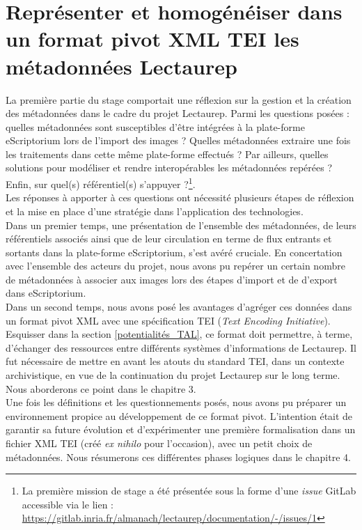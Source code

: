 \part{Représenter et homogénéiser dans un format pivot XML TEI les métadonnées Lectaurep}\label{partie_2}

La première partie du stage comportait une réflexion sur la gestion et la création des métadonnées dans le cadre du projet Lectaurep. Parmi les questions posées : quelles métadonnées sont susceptibles d'être intégrées à la plate-forme eScriptorium lors de l'import des images ? Quelles métadonnées extraire une fois les traitements dans cette même plate-forme effectués ? Par ailleurs, quelles solutions pour modéliser et rendre interopérables les  métadonnées repérées ? Enfin, sur quel(s) référentiel(s) s'appuyer ?\footnote{La première mission de stage a été présentée sous la forme d'une \textit{issue} GitLab accessible via le lien : \url{https://gitlab.inria.fr/almanach/lectaurep/documentation/-/issues/1}}.\\

Les réponses à apporter à ces questions ont nécessité plusieurs étapes de réflexion et la mise en place d'une stratégie dans l'application des technologies.\\

Dans un premier temps, une présentation de l'ensemble des métadonnées, de leurs référentiels associés ainsi que de leur circulation en terme de flux entrants et sortants dans la plate-forme eScriptorium, s'est avéré cruciale. En concertation avec l'ensemble des acteurs du projet, nous avons pu repérer un certain nombre de métadonnées à associer aux images lors des étapes d'import et de d'export dans eScriptorium.\\

Dans un second temps, nous avons posé les avantages d'agréger ces données dans un format pivot XML avec une spécification TEI (\textit{Text Encoding Initiative}). Esquisser dans la section \ref{potentialités_TAL}, ce format doit permettre, à terme, d'échanger des ressources entre différents systèmes d'informations de Lectaurep. Il fut nécessaire de mettre en avant les atouts du standard TEI, dans un contexte archivistique, en vue de la continuation du projet Lectaurep sur le long terme. Nous aborderons ce point dans le chapitre 3.\\ 

Une fois les définitions et les questionnements posés, nous avons pu préparer un environnement propice au développement  de ce format pivot. L'intention était de garantir sa future évolution et d'expérimenter une première formalisation dans un fichier XML TEI (créé \textit{ex nihilo} pour l'occasion), avec un petit choix de métadonnées. Nous résumerons ces différentes phases logiques dans le chapitre 4.


